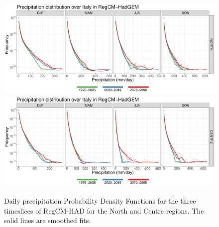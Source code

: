 \begin{figure}
    \centering
        \includegraphics[width=0.8\textheight]{figures/change_rcm/pr/pdf_NORTH_lines}
        \includegraphics[width=0.8\textheight]{figures/change_rcm/pr/pdf_CENTRE_lines}
    \caption[Projected change of RegCM precipitation PDFs (1)]{
        Daily precipitation Probability Density Functions for the three timeslices of RegCM-HAD for the North and Centre regions. The solid lines are smoothed fits.
    }\label{fig:change_rcm_pr_pdf1}
\end{figure}
